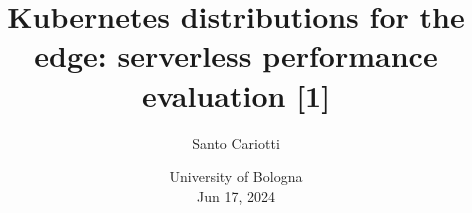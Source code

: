 \documentclass{beamer}
\title[Kubernetes distributions for the edge: serverless performance evaluation]{Kubernetes distributions for the edge: serverless performance evaluation \footnotesize{[1]}}
\author[]{Santo Cariotti}
\date[]{University of Bologna\\ Jun 17, 2024}
\begin{document}
\frame{\titlepage}










\end{document}
